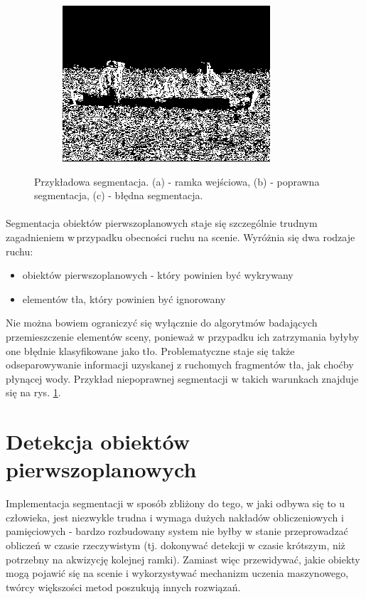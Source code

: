 \begin{figure}[!htb]
\begin{subfigure}[b]{0.3\textwidth}
\includegraphics[width=\textwidth]{img/segBad}
\caption{\label{fig:segBad}}
\end{subfigure}
\caption{Przykładowa segmentacja. (a) - ramka wejściowa, (b) - poprawna segmentacja, (c) - błędna segmentacja. \label{fig:segmentacja}}
\end{figure}

\paragraph{}
Segmentacja obiektów pierwszoplanowych staje się szczególnie trudnym zagadnieniem w\,przypadku obecności ruchu na scenie. Wyróżnia się dwa rodzaje ruchu:
\begin{itemize}
\item obiektów pierwszoplanowych - który powinien być wykrywany
\item elementów tła, który powinien być ignorowany
\end{itemize}
Nie można bowiem ograniczyć się wyłącznie do algorytmów badających przemieszczenie elementów sceny, ponieważ w przypadku ich zatrzymania byłyby one błędnie klasyfikowane jako tło. Problematyczne staje się także odseparowywanie informacji uzyskanej z ruchomych fragmentów tła, jak choćby płynącej wody. Przykład niepoprawnej segmentacji w takich warunkach znajduje się na rys. \ref{fig:segBad}.

\section{Detekcja obiektów pierwszoplanowych}
Implementacja segmentacji w sposób zbliżony do tego, w jaki odbywa się to u człowieka, jest niezwykle trudna i wymaga dużych nakładów obliczeniowych i pamięciowych - bardzo rozbudowany system nie byłby w stanie przeprowadzać obliczeń w czasie rzeczywistym (tj. dokonywać detekcji w czasie krótszym, niż potrzebny na akwizycję kolejnej ramki). Zamiast więc przewidywać, jakie obiekty mogą pojawić się na scenie i wykorzystywać mechanizm uczenia maszynowego, twórcy większości metod poszukują innych rozwiązań.
